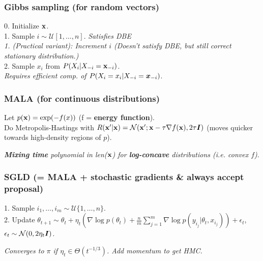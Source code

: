 \subsubsection{Gibbs sampling (for random vectors)}
0. Initialize ${\mathbf{x}}$.\\
1. Sample $i\sim\mathcal{U}[1,\ldots,n]$.\emph{ Satisfies DBE}\\
\emph{1. (Practical variant): Increment $i$ (Doesn't satisfy DBE, but still correct stationary distribution.)}\\
2. Sample $x_i$ from $P(X_i|X_{-i}={\mathbf{x}}_{-i})$.{\tiny\CircArrowRight{}}\\
\emph{Requires efficient comp. of $P(X_i=x_i|X_{-i}={\bm{x}}_{-i})$}.

\subsubsection{MALA (for continuous distributions)}
Let $p({\mathbf{x}}) = \exp(-f(x))$ (f = \textbf{energy function}).\\
Do Metropolis-Hastings with $R({\mathbf{x}}'|{\mathbf{x}}) = \mathcal{N}({\mathbf{x}}';{\mathbf{x}}-\tau\nabla f({\mathbf{x}}), 2\tau{\bm{I}})$ (moves quicker towards high-density regions of $p$).

\emph{\textbf{Mixing time} polynomial in len(${\mathbf{x}}$) for \textbf{log-concave} distributions (i.e. convex $f$)}.

\subsubsection{SGLD (= MALA + stochastic gradients \& always accept proposal)}
1. Sample $i_1,\ldots,i_m \sim \mathcal{U}\{1,\ldots,n\}$.\\
2. Update $\theta_{t+1} \sim \theta_t + \eta_t(\nabla \log p(\theta_t)+\frac{n}{m}\sum_{j=1}^m\nabla \log p(y_{i_j}|\theta_t,x_{i_j})) + \epsilon_t$, $\epsilon_t\sim \mathcal{N}(0, 2\eta_t{\bm{I}})$.

\emph{Converges to $\pi$ if $\eta_t \in \Theta(t^{-1/3})$. Add momentum to get HMC.}